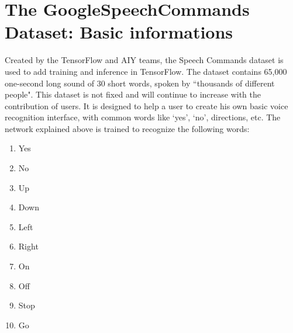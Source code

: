 \documentclass[11pt,a4paper,titlepage]{report}
\providecommand{\tightlist}{%
	\setlength{\itemsep}{0pt}\setlength{\parskip}{0pt}}
\begin{document}
\section{The GoogleSpeechCommands Dataset: Basic informations}
\label{sec:google}
\hspace*{0.6cm}
Created by the TensorFlow and AIY teams, the Speech Commands dataset is used to add training and inference in TensorFlow. The dataset contains 65,000 one-second long sound of 30 short words, spoken by ``thousands of different people". This dataset is not fixed and will continue to increase with the contribution of users. It is designed to help a user to create his own basic voice recognition interface, with common words like `yes', `no', directions, etc. The network explained above is trained to recognize the following words:
\begin{enumerate}
	\tightlist
	\item Yes
	\item No
	\item Up
	\item Down
	\item Left
	\item Right
	\item On
	\item Off
	\item Stop
	\item Go
\end{enumerate}
\end{document}
